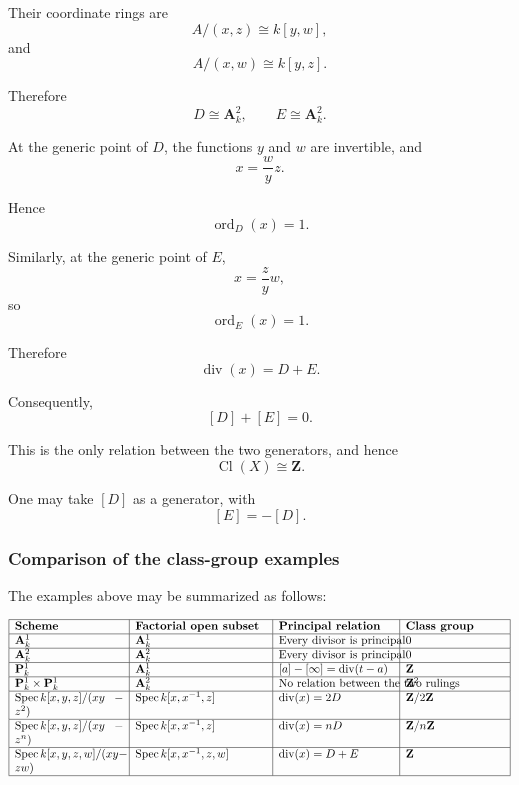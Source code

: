 \documentclass[12pt,a4paper]{article}
\theoremstyle{notespace}
\begin{document}
Their coordinate rings are
\[
A/(x,z)\cong k[y,w],
\]
and
\[
A/(x,w)\cong k[y,z].
\]

Therefore
\[
D\cong\mathbf A^2_k,
\qquad
E\cong\mathbf A^2_k.
\]

At the generic point of \(D\), the functions \(y\) and \(w\) are invertible, and
\[
x=\frac{w}{y}z.
\]

Hence
\[
\operatorname{ord}_D(x)=1.
\]

Similarly, at the generic point of \(E\),
\[
x=\frac{z}{y}w,
\]
so
\[
\operatorname{ord}_E(x)=1.
\]

Therefore
\[
\operatorname{div}(x)=D+E.
\]

Consequently,
\[
[D]+[E]=0.
\]

This is the only relation between the two generators, and hence
\[
\boxed{
	\operatorname{Cl}(X)\cong\mathbf Z.
}
\]

One may take \([D]\) as a generator, with
\[
[E]=-[D].
\]

\subsubsection{Comparison of the class-group examples}

The examples above may be summarized as follows:

\[
\begin{array}{|p{3.3cm}|p{4.0cm}|p{3.5cm}|p{3.0cm}|}
	\hline
	\textbf{Scheme}
	&
	\textbf{Factorial open subset}
	&
	\textbf{Principal relation}
	&
	\textbf{Class group}
	\\
	\hline
	\(\mathbf A^1_k\)
	&
	\(\mathbf A^1_k\)
	&
	\(\text{Every divisor is principal}\)
	&
	\(0\)
	\\
	\hline
	\(\mathbf A^2_k\)
	&
	\(\mathbf A^2_k\)
	&
	\(\text{Every divisor is principal}\)
	&
	\(0\)
	\\
	\hline
	\(\mathbf P^1_k\)
	&
	\(\mathbf A^1_k\)
	&
	\([a]-[\infty]=\operatorname{div}(t-a)\)
	&
	\(\mathbf Z\)
	\\
	\hline
	\(\mathbf P^1_k\times\mathbf P^1_k\)
	&
	\(\mathbf A^2_k\)
	&
	\(\text{No relation between the two rulings}\)
	&
	\(\mathbf Z^2\)
	\\
	\hline
	\(\operatorname{Spec}k[x,y,z]/(xy-z^2)\)
	&
	\(\operatorname{Spec}k[x,x^{-1},z]\)
	&
	\(\operatorname{div}(x)=2D\)
	&
	\(\mathbf Z/2\mathbf Z\)
	\\
	\hline
	\(\operatorname{Spec}k[x,y,z]/(xy-z^n)\)
	&
	\(\operatorname{Spec}k[x,x^{-1},z]\)
	&
	\(\operatorname{div}(x)=nD\)
	&
	\(\mathbf Z/n\mathbf Z\)
	\\
	\hline
	\(\operatorname{Spec}k[x,y,z,w]/(xy-zw)\)
	&
	\(\operatorname{Spec}k[x,x^{-1},z,w]\)
	&
	\(\operatorname{div}(x)=D+E\)
	&
	\(\mathbf Z\)
	\\
	\hline
\end{array}
\]
\end{document}
